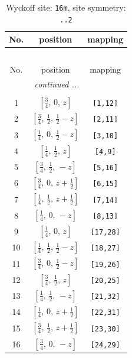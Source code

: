 \documentclass[fleqn,8pt]{jsarticle}
\begin{document}
\renewcommand{\arraystretch}{1.2}
\begin{longtable}{ccc}
\caption{Wyckoff site: {\tt 16m}, site symmetry: {\tt ..2}}
 \\
 \hline \hline
No. & position & mapping \\ \hline \endfirsthead

\multicolumn{2}{l}{\tablename\ \thetable{}} \\
 \hline \hline
No. & position & mapping \\ \hline \endhead

 \hline \hline
\multicolumn{2}{r}{\footnotesize\it continued ...} \\ \endfoot

 \hline \hline
\multicolumn{2}{r}{} \\ \endlastfoot

1 & $\left[ \frac{3}{4},\, 0,\, z \right]$ & {\tt [1,12]} \\ \hline
2 & $\left[ \frac{3}{4},\, \frac{1}{2},\, \frac{1}{2} - z \right]$ & {\tt [2,11]} \\ \hline
3 & $\left[ \frac{1}{4},\, 0,\, \frac{1}{2} - z \right]$ & {\tt [3,10]} \\ \hline
4 & $\left[ \frac{1}{4},\, \frac{1}{2},\, z \right]$ & {\tt [4,9]} \\ \hline
5 & $\left[ \frac{3}{4},\, \frac{1}{2},\, - z \right]$ & {\tt [5,16]} \\ \hline
6 & $\left[ \frac{3}{4},\, 0,\, z + \frac{1}{2} \right]$ & {\tt [6,15]} \\ \hline
7 & $\left[ \frac{1}{4},\, \frac{1}{2},\, z + \frac{1}{2} \right]$ & {\tt [7,14]} \\ \hline
8 & $\left[ \frac{1}{4},\, 0,\, - z \right]$ & {\tt [8,13]} \\ \hline
9 & $\left[ \frac{1}{4},\, 0,\, z \right]$ & {\tt [17,28]} \\ \hline
10 & $\left[ \frac{1}{4},\, \frac{1}{2},\, \frac{1}{2} - z \right]$ & {\tt [18,27]} \\ \hline
11 & $\left[ \frac{3}{4},\, 0,\, \frac{1}{2} - z \right]$ & {\tt [19,26]} \\ \hline
12 & $\left[ \frac{3}{4},\, \frac{1}{2},\, z \right]$ & {\tt [20,25]} \\ \hline
13 & $\left[ \frac{1}{4},\, \frac{1}{2},\, - z \right]$ & {\tt [21,32]} \\ \hline
14 & $\left[ \frac{1}{4},\, 0,\, z + \frac{1}{2} \right]$ & {\tt [22,31]} \\ \hline
15 & $\left[ \frac{3}{4},\, \frac{1}{2},\, z + \frac{1}{2} \right]$ & {\tt [23,30]} \\ \hline
16 & $\left[ \frac{3}{4},\, 0,\, - z \right]$ & {\tt [24,29]} \\
\end{longtable}
\end{document}
